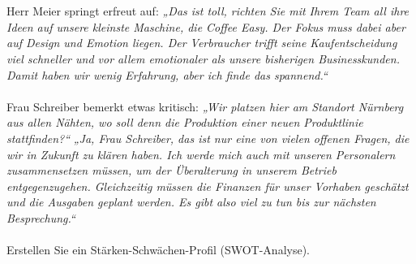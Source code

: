 {\\~\\
Herr Meier springt erfreut auf: \textit{„Das ist toll, richten Sie mit Ihrem Team all ihre Ideen auf unsere kleinste Maschine, die Coffee Easy. Der Fokus muss dabei aber auf Design und Emotion liegen. Der Verbraucher trifft seine Kaufentscheidung viel schneller und vor allem emotionaler als unsere bisherigen Businesskunden. Damit haben wir wenig Erfahrung, aber ich finde das spannend.“}
\\~\\
Frau Schreiber bemerkt etwas kritisch: \textit{„Wir platzen hier am Standort Nürnberg aus allen Nähten, wo soll denn die Produktion einer neuen Produktlinie stattfinden?“} \textit{„Ja, Frau Schreiber, das ist nur eine von vielen offenen Fragen, die wir in Zukunft zu klären haben. Ich werde mich auch mit unseren Personalern zusammensetzen müssen, um der Überalterung in unserem Betrieb entgegenzugehen. Gleichzeitig müssen die Finanzen für unser Vorhaben geschätzt und die Ausgaben geplant werden. Es gibt also viel zu tun bis zur nächsten Besprechung.“}
\\~\\
Erstellen Sie ein Stärken-Schwächen-Profil (SWOT-Analyse).

\solution{

}}

